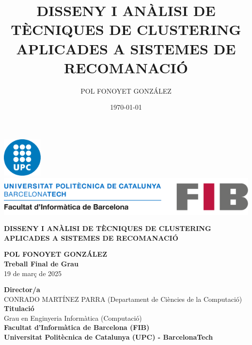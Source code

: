 \documentclass[a4paper,12pt]{report}
\title{DISSENY I ANÀLISI DE TÈCNIQUES DE
CLUSTERING APLICADES A SISTEMES DE
RECOMANACIÓ}
\author{POL FONOYET GONZÁLEZ}
\date{\today}
\begin{document}
\setcounter{secnumdepth}{4}  %

\setlength{\parskip}{10pt}

\begin{titlepage}
    
    \vspace*{-3cm}
    \hspace{-0.15\textwidth}
    \includegraphics[width=0.15\textwidth]{Figuras/logoUPC.png}
    \hspace{0.02\textwidth}
    \includegraphics[width=1\textwidth]{Figuras/logoFIB.png}\par

    \vspace{3cm}
    \centering
    \Large\textbf{DISSENY I ANÀLISI DE TÈCNIQUES DE CLUSTERING APLICADES A SISTEMES DE RECOMANACIÓ}

    \vspace{3cm}
    \centering
    \large\textbf{POL FONOYET GONZÁLEZ}\\
    \vspace{0.5cm}
    \textbf{Treball Final de Grau}\\
    \vspace{0.5cm}
    \Large 19 de març de 2025

    \vspace{3cm}
    \centering
    \small
    \textbf{Director/a}\\
    CONRADO MARTÍNEZ PARRA (Departament de Ciències de la Computació)\\
    \vspace{0.5cm}
    \textbf{Titulació}\\
    Grau en Enginyeria Informàtica (Computació)\\
    \vspace{0.5cm}
    \vspace{0.5cm}
    \textbf{Facultat d'Informàtica de Barcelona (FIB)}\\
    \vspace{0.5cm}
    \textbf{Universitat Politècnica de Catalunya (UPC) - BarcelonaTech}\\


\end{titlepage}
\end{document}
